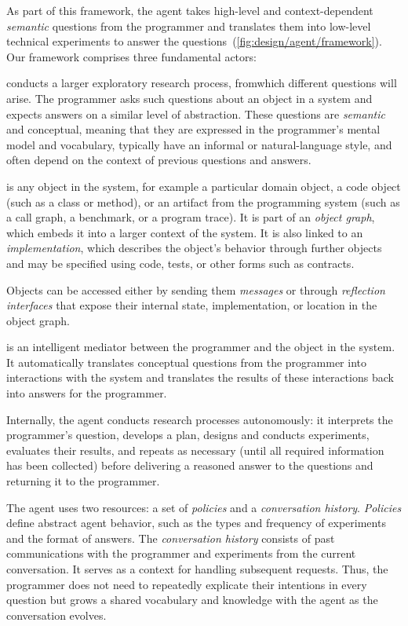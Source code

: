 As part of this framework, the agent takes high-level and context-dependent \emph{semantic} questions from the programmer and translates them into low-level technical experiments to answer the questions~(\cref{fig:design/agent/framework}).
Our framework comprises three fundamental actors:

\begin{description}[noextralabelsep]
	\item[The programmer] conducts a larger exploratory research process, from\linebreak which different questions will arise.
	The programmer asks such questions about an object in a system and expects answers on a similar level of abstraction.
	These questions are \emph{semantic} and conceptual, meaning that they are expressed in the programmer's mental model and vocabulary, typically have an informal or natural-language style, and often depend on the context of previous questions and answers.

	\item[The object] is any object in the system, for example a particular domain object, a code object (such as a class or method), or an artifact from the programming system (such as a call graph, a benchmark, or a program trace).
	It is part of an \emph{object graph}, which embeds it into a larger context of the system.
	It is also linked to an \emph{implementation}, which describes the object's behavior through further objects and may be specified using code, tests, or other forms such as contracts.

	Objects can be accessed either by sending them \emph{messages} or through \emph{reflection interfaces} that expose their internal state, implementation, or location in the object graph.

	\item[The exploratory programming agent] is an intelligent mediator between the programmer and the object in the system.
	It automatically translates conceptual questions from the programmer into interactions with the system and translates the results of these interactions back into answers for the programmer.

	Internally, the agent conducts research processes autonomously: it interprets the programmer's question, develops a plan, designs and conducts experiments, evaluates their results, and repeats as necessary (until all required information has been collected) before delivering a reasoned answer to the questions and returning it to the programmer.

	The agent uses two resources: a set of \emph{policies} and a \emph{conversation history}.
	\emph{Policies} define abstract agent behavior, such as the types and frequency of experiments and the format of answers.
	The \emph{conversation history} consists of past communications with the programmer and experiments from the current conversation.
	It serves as a context for handling subsequent requests.
	Thus, the programmer does not need to repeatedly explicate their intentions in every question but grows a shared vocabulary and knowledge with the agent as the conversation evolves.
\end{description}

